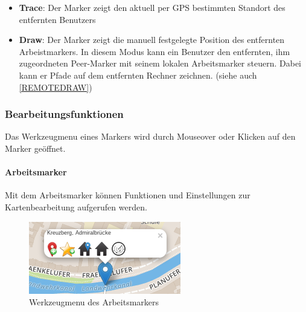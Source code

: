 \begin{itemize}[leftmargin=*,noitemsep,topsep=1ex,parsep=0pt,partopsep=0pt]
	\begin{itemize}
		\item \textbf{Trace}: Der Marker zeigt den aktuell per GPS bestimmten Standort des entfernten Benutzers
		\item \textbf{Draw}: Der Marker zeigt die manuell festgelegte Position des entfernten Arbeistmarkers. In diesem Modus kann ein Benutzer den entfernten, ihm zugeordneten Peer-Marker mit seinem lokalen Arbeitsmarker steuern. Dabei kann er Pfade auf dem entfernten Rechner zeichnen. (siehe auch \ref{REMOTEDRAW})
	\end{itemize}
\end{itemize}

\subsubsection{Bearbeitungsfunktionen}
Das Werkzeugmenu eines Markers wird durch Mouseover oder Klicken auf den Marker geöffnet.

\paragraph{Arbeitsmarker}
Mit dem Arbeitsmarker können Funktionen und Einstellungen zur Kartenbearbeitung aufgerufen werden.

  \begin{figure}[H]
      \centering
	  \includegraphics[scale=0.8]{bilder/screenshots/menu_arbeitsmarker.png}\\ 
  	  Werkzeugmenu des Arbeitsmarkers
  \end{figure}

